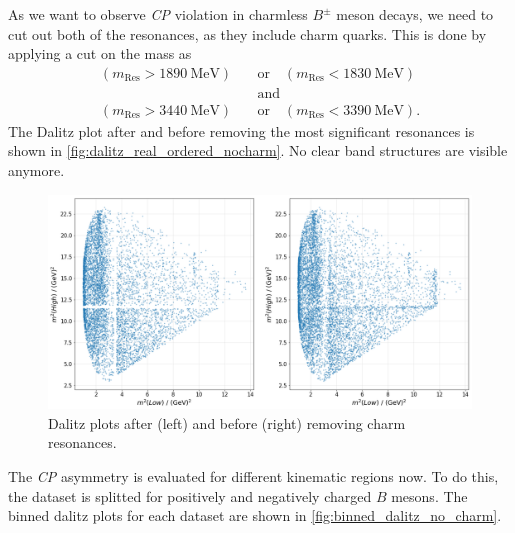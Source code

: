 As we want to observe \textit{CP} violation in charmless $B^{\pm}$ meson decays, we need to cut out both of the resonances, as they include charm quarks. This is done by applying a cut on the mass as 
\begin{align*}
  (m_{\mathrm{Res}} > \qty{1890}{\mega\electronvolt}) \quad &\mathrm{or} \quad (m_{\mathrm{Res}} < \qty{1830}{\mega\electronvolt})\\
  &\mathrm{and} \\
  (m_{\mathrm{Res}} > \qty{3440}{\mega\electronvolt}) \quad &\mathrm{or} \quad (m_{\mathrm{Res}} < \qty{3390}{\mega\electronvolt}).
\end{align*}
The Dalitz plot after and before removing the most significant resonances is shown in \autoref{fig:dalitz_real_ordered_nocharm}. No clear band structures are visible anymore.
\begin{figure}
  \centering
  \includegraphics[width = .95\textwidth]{"content/pics/dalitz_real_ordered_no_charm.png"}
  \caption{Dalitz plots after (left) and before (right) removing charm resonances.}
  \label{fig:dalitz_real_ordered_nocharm}
\end{figure}
The \textit{CP} asymmetry is evaluated for different kinematic regions now. To do this, the dataset is splitted for positively and negatively charged $B$ mesons. The binned dalitz plots for each dataset are shown in \autoref{fig:binned_dalitz_no_charm}.

